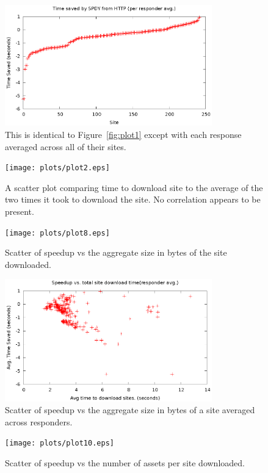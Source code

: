 \documentclass[10pt,letterpaper,notitlepage]{article}
\begin{document}
\begin{figure}[H]
\centering
\includegraphics[width=0.8\textwidth]{plots/plot3.eps}
\caption{This is identical to Figure~\ref{fig:plot1} except with each response
averaged across all of their sites.}
\label{fig:plot3}
\end{figure}

\begin{figure}[H]
\centering
\texttt{[image: plots/plot2.eps]}
\caption{A scatter plot comparing time to download site to the average of the
    two times it took to download the site.  No correlation appears to be
present.}
\label{fig:plot2}
\end{figure}

\begin{figure}[H]
\centering
\texttt{[image: plots/plot8.eps]}
\caption{Scatter of speedup vs the aggregate size in bytes of the site
downloaded.}
\label{fig:plot8}
\end{figure}

\begin{figure}[H]
\centering
\includegraphics[width=0.8\textwidth]{plots/plot12.eps}
\caption{Scatter of speedup vs the aggregate size in bytes of a site averaged
across responders.}
\label{fig:plot12}
\end{figure}

\begin{figure}[H]
\centering
\texttt{[image: plots/plot10.eps]}
\caption{Scatter of speedup vs the number of assets per site
downloaded.}
\label{fig:plot10}
\end{figure}
\end{document}
